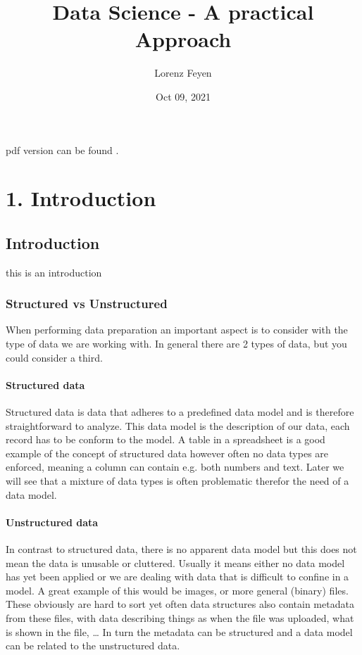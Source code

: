 \documentclass[letterpaper,10pt,english]{jupyterBook}
\title{Data Science - A practical Approach}
\date{Oct 09, 2021}
\author{Lorenz Feyen}
\begin{document}
\pagestyle{empty}
\sphinxmaketitle
\pagestyle{plain}
\sphinxtableofcontents
\pagestyle{normal}
\label{\detokenize{foreword::doc}}


\sphinxAtStartPar
pdf version can be found .


\part{1. Introduction}


\chapter{Introduction}
\label{\detokenize{c1_introduction/introduction:introduction}}\label{\detokenize{c1_introduction/introduction::doc}}
\sphinxAtStartPar
this is an introduction


\section{Structured vs Unstructured}
\label{\detokenize{c1_introduction/introduction:structured-vs-unstructured}}
\sphinxAtStartPar
When performing data preparation an important aspect is to consider with the type of data we are working with.
In general there are 2 types of data, but you could consider a third.


\subsection{Structured data}
\label{\detokenize{c1_introduction/introduction:structured-data}}
\sphinxAtStartPar
Structured data is data that adheres to a pre\sphinxhyphen{}defined data model and is therefore straightforward to analyze.
This data model is the description of our data, each record has to be conform to the model.
A table in a spreadsheet is a good example of the concept of structured data however often no data types are enforced, meaning a column can contain e.g. both numbers and text.
Later we will see that a mixture of data types is often problematic therefor the need of a data model.


\subsection{Unstructured data}
\label{\detokenize{c1_introduction/introduction:unstructured-data}}
\sphinxAtStartPar
In contrast to structured data, there is no apparent data model but this does not mean the data is unusable or cluttered.
Usually it means either no data model has yet been applied or we are dealing with data that is difficult to confine in a model.
A great example of this would be images, or more general (binary) files.
These obviously are hard to sort yet often data structures also contain metadata from these files, with data describing things as when the file was uploaded, what is shown in the file, …
In turn the metadata can be structured and a data model can be related to the unstructured data.
\end{document}
